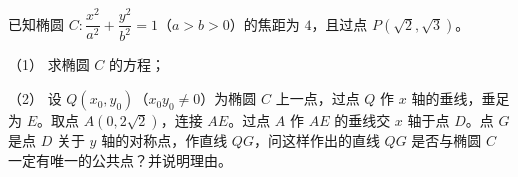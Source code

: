 \begin{question}
已知椭圆 $C:\dfrac{x^2}{a^2}+\dfrac{y^2}{b^2}=1$（$a>b>0$）的焦距为 $4$，且过点 $P(\sqrt2,\sqrt3)$。

（1） 求椭圆 $C$ 的方程；

（2） 设 $Q(x_0,y_0)$（$x_0y_0\neq0$）为椭圆 $C$ 上一点，过点 $Q$ 作 $x$ 轴的垂线，垂足为 $E$。取点 $A(0,2\sqrt2)$，连接 $AE$。过点 $A$ 作 $AE$ 的垂线交 $x$ 轴于点 $D$。点 $G$ 是点 $D$ 关于 $y$ 轴的对称点，作直线 $QG$，问这样作出的直线 $QG$ 是否与椭圆 $C$ 一定有唯一的公共点？并说明理由。

\end{question}